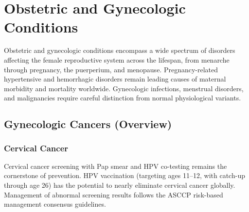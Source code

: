 \chapter{Obstetric and Gynecologic Conditions}
\label{ch:obstetric}
Obstetric and gynecologic conditions encompass a wide spectrum of disorders affecting the female reproductive system across the lifespan, from menarche through pregnancy, the puerperium, and menopause. Pregnancy-related hypertensive and hemorrhagic disorders remain leading causes of maternal morbidity and mortality worldwide. Gynecologic infections, menstrual disorders, and malignancies require careful distinction from normal physiological variants.

\section{Gynecologic Cancers (Overview)}








\label{sec:Gynecologic Cancers (Overview)}

\subsection{Cervical Cancer}
\label{sec:obstetric:Cervical Cancer}
Cervical cancer screening with Pap smear and HPV co-testing remains the cornerstone of prevention. HPV vaccination (targeting ages 11--12, with catch-up through age 26) has the potential to nearly eliminate cervical cancer globally. Management of abnormal screening results follows the ASCCP risk-based management consensus guidelines.

